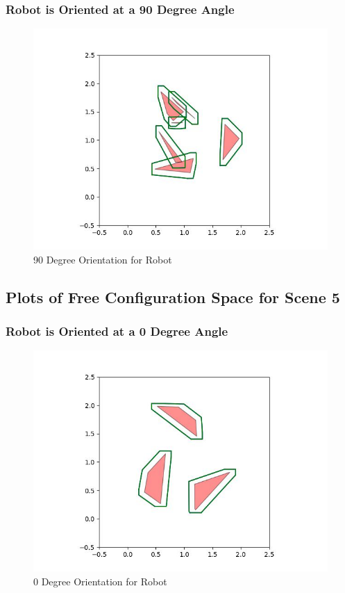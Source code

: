 \documentclass{article}
\begin{document}
\newpage
\subsubsection{Robot is Oriented at a 90 Degree Angle}
\begin{figure}[h!]
	\includegraphics[width= 0.9 \linewidth]{Problem3_minkowski4_90.jpg}
	\centering
	\caption{90 Degree Orientation for Robot}
	\label{Problem3_minkowski4_90.jpg}
\end{figure}

\newpage
\subsection{Plots of Free Configuration Space for Scene 5}
\subsubsection{Robot is Oriented at a 0 Degree Angle}
\begin{figure}[h!]
	\includegraphics[width= 0.9 \linewidth]{Problem3_minkowski5_0.jpg}
	\centering
	\caption{0 Degree Orientation for Robot}
	\label{Problem3_minkowski5_0.jpg}
\end{figure}
\end{document}
